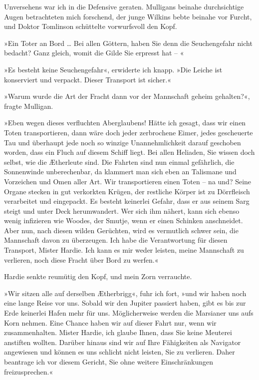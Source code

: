 Unversehens war ich in die Defensive geraten. Mulligans beinahe
durchsichtige Augen betrachteten mich forschend, der junge Wilkins
bebte beinahe vor Furcht, und Doktor Tomlinson schüttelte
vorwurfsvoll den Kopf.

»Ein Toter an Bord \ldots{} Bei allen Göttern, haben Sie denn die
Seuchengefahr nicht bedacht? Ganz gleich, womit die Gilde Sie
erpresst hat – «

»Es besteht keine Seuchengefahr«, erwiderte ich knapp. »Die Leiche
ist konserviert und verpackt. Dieser Transport ist sicher.«

»Warum wurde die Art der Fracht dann vor der Mannschaft geheim
gehalten?«, fragte Mulligan.

»Eben wegen dieses verfluchten Aberglaubens! Hätte ich gesagt, dass
wir einen Toten transportieren, dann wäre doch jeder zerbrochene
Eimer, jedes gescheuerte Tau und überhaupt jede noch so winzige
Unannehmlichkeit darauf geschoben worden, dass ein Fluch auf diesem
Schiff liegt. Bei allen Heliaden, Sie wissen doch selbst, wie die
Ætherleute sind. Die Fahrten sind nun einmal gefährlich, die
Sonnenwinde unberechenbar, da klammert man sich eben an Talismane
und Vorzeichen und Omen aller Art. Wir transportieren einen Toten –
na und? Seine Organe stecken in gut verkorkten Krügen, der
restliche Körper ist zu Dörrfleisch verarbeitet und eingepackt. Es
besteht keinerlei Gefahr, dass er aus seinem Sarg steigt und unter
Deck herumwandert. Wer sich ihm nähert, kann sich ebenso wenig
infizieren wie Woodes, der Smutje, wenn er einen Schinken
anschneidet. Aber nun, nach diesen wilden Gerüchten, wird es
vermutlich schwer sein, die Mannschaft davon zu überzeugen. Ich
habe die Verantwortung für diesen Transport, Mister Hardie. Ich
kann es mir weder leisten, meine Mannschaft zu verlieren, noch
diese Fracht über Bord zu werfen.«

Hardie senkte reumütig den Kopf, und mein Zorn verrauchte.

»Wir sitzen alle auf derselben Ætherbrigg«, fuhr ich fort, »und wir
haben noch eine lange Reise vor uns. Sobald wir den Jupiter
passiert haben, gibt es bis zur Erde keinerlei Hafen mehr für uns.
Möglicherweise werden die Marsianer uns aufs Korn nehmen. Eine
Chance haben wir auf dieser Fahrt nur, wenn wir zusammenhalten.
Mister Hardie, ich glaube Ihnen, dass Sie keine Meuterei anstiften
wollten. Darüber hinaus sind wir auf Ihre Fähigkeiten als Navigator
angewiesen und können es uns schlicht nicht leisten, Sie zu
verlieren. Daher beantrage ich vor diesem Gericht, Sie ohne weitere
Einschränkungen freizusprechen.«

